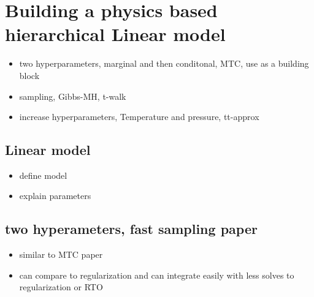 
\chapter{Building a physics based hierarchical Linear model}
\begin{itemize}
	\item two hyperparameters, marginal and then conditonal, MTC, use as a building block
	\item  sampling, Gibbs-MH, t-walk
	\item increase hyperparameters, Temperature and pressure, tt-approx
\end{itemize}

\section{Linear model}
\begin{itemize}
	\item define model
	\item explain parameters
\end{itemize}

\section{two hyperameters, fast sampling paper}
\begin{itemize}
	\item similar to MTC paper
	\item can compare to regularization and can integrate easily with less solves to regularization or RTO
\end{itemize}

